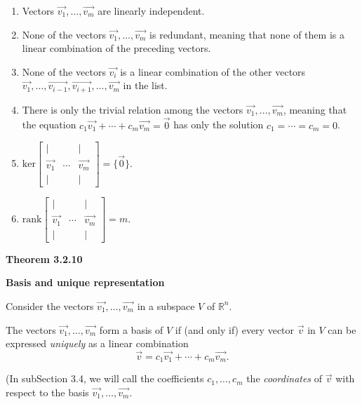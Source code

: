 \begin{enumerate}
\item Vectors $\vec{v_{1}},\ldots{},\vec{v_{m}}$ are linearly independent.
\item None of the vectors $\vec{v_{1}},\ldots{},\vec{v_{m}}$ is redundant, meaning that none of them is a linear combination of the preceding vectors.
\item None of the vectors $\vec{v_{i}}$ is a linear combination of the other vectors $\vec{v_{1}},\ldots{},\vec{v_{i-1}},\vec{v_{i+1}},\ldots{},\vec{v_{m}}$ in the list.
\item There is only the trivial relation among the vectors $\vec{v_{1}},\ldots{},\vec{v_{m}}$, meaning that the equation $c_{1}\vec{v_{1}}+\cdots{}+c_{m}\vec{v_{m}}=\vec{0}$ has only the solution $c_{1}=\cdots{}=c_{m}=0$.
\item $\displaystyle\textrm{ker}\left[\begin{array}{ccc} |& &|\\ \vec{v_{1}}&\cdots{}&\vec{v_{m}}\\ |& &|\end{array}\right]=\{\vec{0}\}$.
\item $\displaystyle\textrm{rank}\left[\begin{array}{ccc} |& &|\\ \vec{v_{1}}&\cdots{}&\vec{v_{m}}\\ |& &|\end{array}\right]=m$.
\end{enumerate}
\textbf{Theorem 3.2.10}\\
\par\noindent\textbf{Basis and unique representation}
\par\noindent Consider the vectors $\vec{v_{1}},\ldots{},\vec{v_{m}}$ in a subspace $V$ of $\mathbb{R}^{n}$.
\par\noindent The vectors $\vec{v_{1}},\ldots{},\vec{v_{m}}$ form a basis of $V$ if (and only if) every vector $\vec{v}$ in $V$ can be expressed \textit{uniquely} as a linear combination
\[\vec{v}=c_{1}\vec{v_{1}}+\cdots{}+c_{m}\vec{v_{m}}.\]
\par\noindent (In subSection 3.4, we will call the coefficients $c_{1},\ldots{},c_{m}$ the \textit{coordinates} of $\vec{v}$ with respect to the basis $\vec{v_{1}},\ldots{},\vec{v_{m}}$.
\pagebreak

